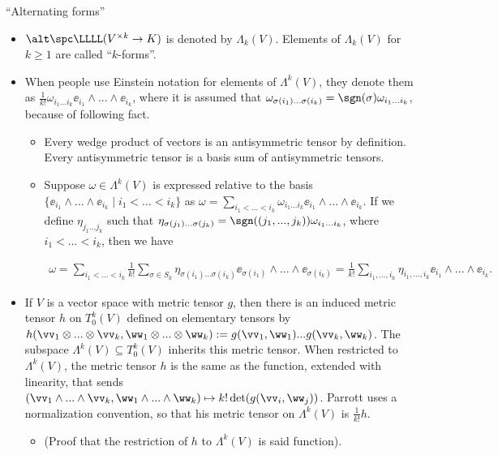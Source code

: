 ``Alternating forms''
\begin{itemize}
	\item $\alt \spc \LLLL(V^{\times k} \rightarrow K)$ is denoted by $\Lambda_k(V)$. Elements of $\Lambda_k(V)$ for $k \geq 1$ are called ``$k$-forms''.
	
	\item When people use Einstein notation for elements of $\Lambda^k(V)$, they denote them as $\frac{1}{k!} \omega_{i_1 ... i_k} \ee_{i_1} \wedge ... \wedge \ee_{i_k}$, where it is assumed that $\omega_{\sigma(i_1) ... \sigma(i_k)} = \sgn(\sigma) \omega_{i_1 ... i_k}$, because of following fact.
	
	\begin{itemize}
		\item Every wedge product of vectors is an antisymmetric tensor by definition. Every antisymmetric tensor is a basis sum of antisymmetric tensors.
		\item Suppose $\omega \in \Lambda^k(V)$ is expressed relative to the basis $\{ \ee_{i_1} \wedge ... \wedge \ee_{i_k} \mid i_1 < ... < i_k \}$ as $\omega = \sum_{i_1 < ... < i_k} \omega_{i_1 ... i_k} \ee_{i_1} \wedge ... \wedge \ee_{i_k}$. If we define $\eta_{j_1 ... j_k}$ such that $\eta_{\sigma(j_1) ... \sigma(j_k)} = \sgn((j_1, ..., j_k)) \omega_{i_1 ... i_k}$, where $i_1 < ... < i_k$, then we have
		
		\begin{align*}
			\omega = \sum_{i_1 < ... < i_k} \frac{1}{k!} \sum_{\sigma \in S_k} \eta_{\sigma(i_1) ... \sigma(i_k)} \ee_{\sigma(i_1)} \wedge ... \wedge \ee_{\sigma(i_k)} = \frac{1}{k!} \sum_{i_1, ..., i_k} \eta_{i_1, ..., i_k} \ee_{i_1} \wedge ... \wedge \ee_{i_k}.
		\end{align*}
	\end{itemize}
	
	\item If $V$ is a vector space with metric tensor $g$, then there is an induced metric tensor $h$ on $T^k_0(V)$ defined on elementary tensors by $h(\vv_1 \otimes ... \otimes \vv_k, \ww_1 \otimes ... \otimes \ww_k) := g(\vv_1, \ww_1) ... g(\vv_k, \ww_k)$. The subspace $\Lambda^k(V) \subseteq T^k_0(V)$ inherits this metric tensor. When restricted to $\Lambda^k(V)$, the metric tensor $h$ is the same as the function, extended with linearity, that sends $(\vv_1 \wedge ... \wedge \vv_k, \ww_1 \wedge ... \wedge \ww_k) \mapsto k! \det(g(\vv_i, \ww_j))$. Parrott uses a normalization convention, so that his metric tensor on $\Lambda^k(V)$ is $\frac{1}{k!} h$.
	\begin{itemize}
		\item (Proof that the restriction of $h$ to $\Lambda^k(V)$ is said function). 
		

\end{itemize}
\end{itemize}
